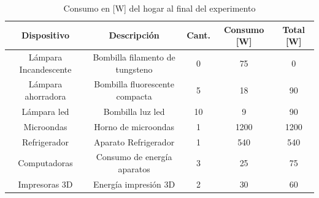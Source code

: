 \documentclass[]{article}
\begin{document}
\begin{table}[h!]
\centering

\begin{tabular}{|c|c|c|c|c|}
\hline
Dispositivo           & Descripción                     & Cant. & Consumo {[}W{]} & Total [W] \\ \hline
Lámpara Incandescente & Bombilla filamento de tungsteno & 0                  & 75              & 0           \\ \hline
Lámpara ahorradora    & Bombilla fluorescente compacta  & 5                 & 18              & 90           \\ \hline
Lámpara led           & Bombilla luz led                & 10                  & 9               & 90            \\ \hline
Microondas            & Horno de microondas             & 1                  & 1200            & 1200          \\ \hline
Refrigerador          & Aparato Refrigerador            & 1                  & 540             & 540           \\ \hline
Computadoras          & Consumo de energía aparatos     & 3                  & 25              & 75            \\ \hline
Impresoras 3D         & Energía impresión 3D            & 2                  & 30              & 60            \\ \hline
\end{tabular}
\caption{Consumo en [W] del hogar al final del experimento}
\label{tablaConsumoSegundo}
\end{table}




%
\end{document}
